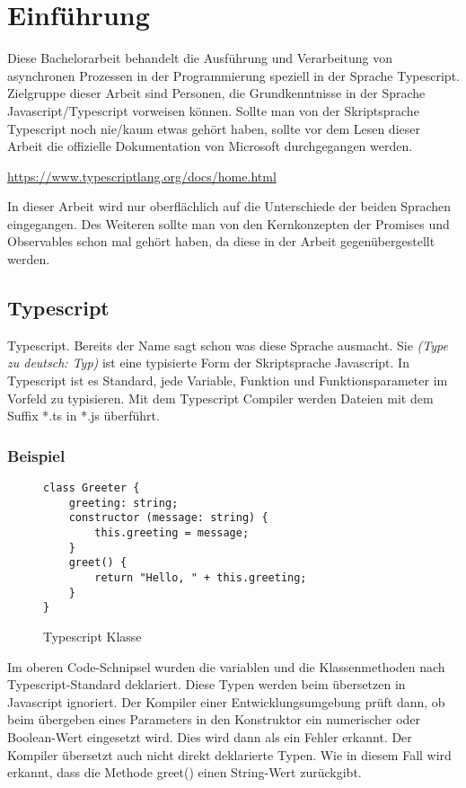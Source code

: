 \setcounter{secnumdepth}{1}
\section{Einführung}
Diese Bachelorarbeit behandelt die Ausführung und Verarbeitung von asynchronen Prozessen in der Programmierung speziell in der Sprache Typescript.\\

\noindent
Zielgruppe dieser Arbeit sind Personen, die Grundkenntnisse in der Sprache Javascript/Typescript vorweisen können.
Sollte man von der Skriptsprache Typescript noch nie/kaum etwas gehört haben, sollte vor dem Lesen dieser Arbeit die offizielle Dokumentation von Microsoft durchgegangen werden.

\begin{center}
\url{https://www.typescriptlang.org/docs/home.html} 
\end{center}

\noindent
In dieser Arbeit wird nur oberflächlich auf die Unterschiede der beiden Sprachen eingegangen. Des Weiteren sollte man von den Kernkonzepten der Promises und Observables schon mal gehört haben, da diese in der Arbeit gegenübergestellt werden.

\subsection{Typescript}
Typescript. Bereits der Name sagt schon was diese Sprache ausmacht. Sie \textit{(\glqq{}Type\grqq{} zu deutsch: Typ)} ist eine typisierte Form der Skriptsprache Javascript. In Typescript ist es Standard, jede Variable, Funktion und Funktionsparameter im Vorfeld zu typisieren. Mit dem Typescript Compiler werden Dateien mit dem Suffix *.ts in *.js überführt.

\subsubsection{Beispiel}

\begin{figure}[h!]
\begin{lstlisting}
class Greeter {
    greeting: string;
    constructor (message: string) {
        this.greeting = message;
    }
    greet() {
        return "Hello, " + this.greeting;
    }
}  
\end{lstlisting}
\caption{Typescript Klasse \cite{typescript-example}}
\end{figure}

\noindent
Im oberen Code-Schnipsel wurden die variablen und die Klassenmethoden nach Typescript-Standard deklariert. Diese Typen werden beim übersetzen in Javascript ignoriert. Der Kompiler einer Entwicklungsumgebung prüft dann, ob beim übergeben eines Parameters in den Konstruktor ein numerischer oder Boolean-Wert eingesetzt wird. Dies wird dann als ein Fehler erkannt. Der Kompiler übersetzt auch nicht direkt deklarierte Typen. Wie in diesem Fall wird erkannt, dass die Methode greet() einen String-Wert zurückgibt.

